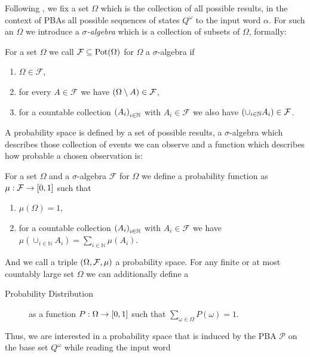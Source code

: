 Following \cite{Groesser,Bauer}, we fix a set $\Omega$ which is the collection 
of all possible results, in the context of \acp{PBA} all possible sequences of
states $Q^{\omega}$ to the input word $\alpha$. 
For such an $\Omega$ we introduce a \emph{$\sigma$-algebra} which is a 
collection of subsets of $\Omega$, formally:
\begin{definition}
  For a set $\Omega$ we call $\mathcal{F}\subseteq\operatorname{Pot}(\Omega)$ for $\Omega$ a
  $\sigma$-algebra if
  \begin{enumerate}
    \item $\Omega\in\mathcal{F}$,
    \item for every $A\in\mathcal{F}$ we have $\left(\Omega\setminus A\right)
      \in\mathcal{F}$,
    \item for a countable collection $\left(A_{i}\right)_{i\in\mathbb{N}}$ with
      $A_{i}\in\mathcal{F}$ we also have $\left(\cup_{i\in\mathbb{N}}A_{i}\right)\in
      \mathcal{F}$.
  \end{enumerate}
\end{definition}
A probability space is defined by a set of possible results, a $\sigma$-algebra
which describes those collection of events we can observe and a function which
describes how probable a chosen observation is:
\begin{definition}
  For a set $\Omega$ and a $\sigma$-algebra $\mathcal{F}$ for $\Omega$ we
  define a probability function as $\mu:\mathcal{F}\rightarrow\left[0,1\right]$
  such that
  \begin{enumerate}
    \item $\mu(\Omega) = 1$,
    \item for a countable collection $\left(A_{i}\right)_{i\in\mathbb{N}}$ with
      $A_{i}\in\mathcal{F}$ we have $\mu(\cup_{i\in\mathbb{N}}A_{i}) =
      \sum_{i\in\mathbb{N}}\mu(A_{i})$.
  \end{enumerate}
  And we call a triple $\left(\Omega,\mathcal{F},\mu\right)$ a probability space.
  For any finite or at most countably large set $\Omega$ we can additionally
  define a
  \begin{description}
    \item [Probability Distribution] as a function
      $P:\Omega\rightarrow\left[0,1\right]$ such that
      $\sum_{\omega\in\Omega}P(\omega) = 1$. 
  \end{description}
\end{definition}
Thus, we are interested in a probability space that is induced by the \ac{PBA}
$\mathcal{P}$ on the base set $Q^{\omega}$ while reading the input word 
